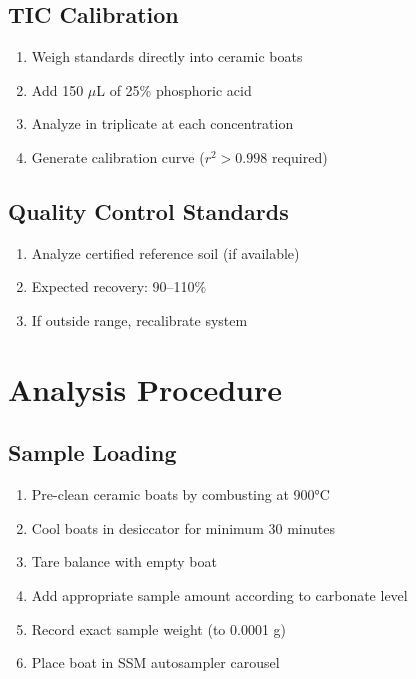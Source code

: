 \documentclass[11pt,a4paper]{article}\usepackage[]{graphicx}\usepackage[]{xcolor}
\begin{document}
\subsection{TIC Calibration}
\begin{enumerate}[noitemsep]
    \item Weigh  standards directly into ceramic boats
    \item Add 150 $\mu$L of 25\% phosphoric acid
    \item Analyze in triplicate at each concentration
    \item Generate calibration curve ($r^2 > 0.998$ required)
\end{enumerate}

\subsection{Quality Control Standards}
\begin{enumerate}[noitemsep]
    \item Analyze certified reference soil (if available)
    \item Expected recovery: 90--110\%
    \item If outside range, recalibrate system
\end{enumerate}

\section{Analysis Procedure}

\subsection{Sample Loading}
\begin{enumerate}[noitemsep]
    \item Pre-clean ceramic boats by combusting at 900°C
    \item Cool boats in desiccator for minimum 30 minutes
    \item Tare balance with empty boat
    \item Add appropriate sample amount according to carbonate level
    \item Record exact sample weight (to 0.0001 g)
    \item Place boat in SSM autosampler carousel
\end{enumerate}
\end{document}
